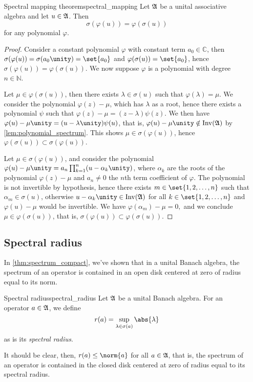 \begin{theorem}{Spectral mapping theorem}{spectral_mapping}
    Let \(\mathfrak{A}\) be a unital associative algebra and let \(u \in \mathfrak{A}\). Then
    \begin{equation*}
        \sigma(\varphi(u)) = \varphi(\sigma(u))
    \end{equation*}
    for any polynomial \(\varphi\).
\end{theorem}
\begin{proof}
    Consider a constant polynomial \(\varphi\) with constant term \(a_0 \in \mathbb{C}\), then \(\sigma(\varphi(u)) = \sigma(a_0\unity) = \set{a_0}\) and \(\varphi(\sigma(u)) = \set{a_0}\), hence \(\sigma(\varphi(u)) = \varphi(\sigma(u))\). We now suppose \(\varphi\) is a polynomial with degree \(n \in \mathbb{N}\).

    Let \(\mu \in \varphi(\sigma(u))\), then there exists \(\lambda \in \sigma(u)\) such that \(\varphi(\lambda) = \mu\). We consider the polynomial \(\varphi(z) - \mu\), which has \(\lambda\) as a root, hence there exists a polynomial \(\psi\) such that \(\varphi(z) - \mu = (z - \lambda)\psi(z)\). We then have \(\varphi(u) - \mu \unity = (u - \lambda \unity)\psi(u)\), that is, \(\varphi(u) - \mu \unity \notin \invertible{\algebra{A}}\) by \cref{lem:polynomial_spectrum}. This shows \(\mu \in \sigma(\varphi(u))\), hence \(\varphi(\sigma(u)) \subset \sigma(\varphi(u))\).

    Let \(\mu \in \sigma(\varphi(u))\), and consider the polynomial \(\varphi(u) - \mu\unity = a_n \prod_{k=1}^n (u - \alpha_k\unity)\), where \(\alpha_k\) are the roots of the polynomial \(\varphi(z) - \mu\) and \(a_n \neq 0\) the \(n\)th term coefficient of \(\varphi\). The polynomial is not invertible by hypothesis, hence there exists \(m \in \set{1,2,\dots, n}\) such that \(\alpha_m \in \sigma(u)\), otherwise \(u - \alpha_k \unity \in \invertible{\algebra{A}}\) for all \(k \in \set{1,2, \dots, n}\) and \(\varphi(u) - \mu\) would be invertible. We have \(\varphi(\alpha_m) - \mu = 0,\) and we conclude \(\mu \in \varphi(\sigma(u))\), that is, \(\sigma(\varphi(u)) \subset \varphi(\sigma(u))\).
\end{proof}

\subsection{Spectral radius}
In \cref{thm:spectrum_compact}, we've shown that in a unital Banach algebra, the spectrum of an operator is contained in an open disk centered at zero of radius equal to its norm.
\begin{definition}{Spectral radius}{spectral_radius}
    Let \(\mathfrak{A}\) be a unital Banach algebra. For an operator \(a \in \mathfrak{A}\), we define
    \begin{equation*}
        r(a) = \sup_{\lambda \in \sigma(a)}{\abs{\lambda}}
    \end{equation*}
    as is its \emph{spectral radius}.
\end{definition}
It should be clear, then, \(r(a) \leq \norm{a}\) for all \(a \in \mathfrak{A}\), that is, the spectrum of an operator is contained in the closed disk centered at zero of radius equal to its spectral radius.

